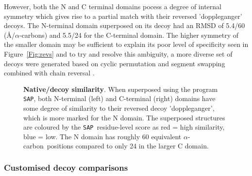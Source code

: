 \documentclass[preprint,12pt]{elsarticle}
\newcommand{\CA}{$\alpha$-carbon}
\newcommand{\SAP}{{\tt SAP}}
\newcommand{\Fig}[1]{Figure~\ref{Fig:#1}}
\begin{document}
However, both the N and C terminal domains pocess a degree of internal symmetry which gives
rise to a partial match with their reversed 'doppleganger' decoys.   The N-terminal domain superposed on its decoy
had an RMSD of 5.4/60 (\AA/\CA s) and 5.5/24 for the C-terminal domain.   The higher symmetry of the smaller
domain may be sufficient to explain its poor level of specificity seen in \Fig{revs} and to try and resolve this
ambiguity, a more diverse set of decoys were generated based on cyclic permutation and segment swapping combined
with chain reversal \cite{TaylorWR06a}.

\begin{figure}
\centering
{}
\begin{footnotesize}
\caption{
\label{Fig:tows}
{\bf Native/decoy similarity}.
When superposed using the program \SAP, both N-terminal (left) and C-terminal (right) domains
have some degree of similarity to their reversed decoy 'doppleganger', which is more marked
for the N domain.   The superposed structures are coloured by the \SAP\ residue-level score as
red = high similarity, blue = low.  The N domain has roughly 60 equivalent \CA\ positions
compared to only 24 in the larger C domain.
}
\end{footnotesize}
\end{figure}

\subsubsection{Customised decoy comparisons}
\end{document}
